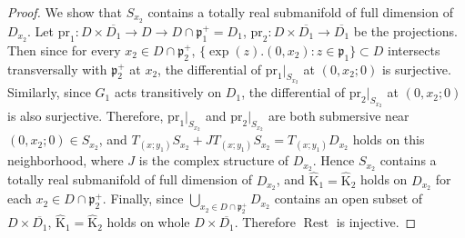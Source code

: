 \documentclass[pdftex]{sigma}
\numberwithin{equation}{section}
\newcommand{\fp}{\mathfrak{p}}
\newcommand{\rK}{\mathrm{K}}
\newcommand{\Rest}{\operatorname{Rest}}
\begin{document}
\begin{proof}
We show that $S_{x_2}$ contains a totally real submanifold of full dimension of $D_{x_2}$.
Let $\mathrm{pr}_1\colon D\times\overline{D_1}\to D\to D\cap\fp^+_1=D_1$, $\mathrm{pr}_2\colon D\times\overline{D_1}\to \overline{D_1}$
be the projections. Then since for every $x_2\in D\cap\fp^+_2$, $\{\exp(z).(0,x_2)\colon z\in\fp_1\}\subset D$ intersects transversally
with $\fp^+_2$ at $x_2$, the differential of $\mathrm{pr}_1|_{S_{x_2}}$ at $(0,x_2;0)$ is surjective.
Similarly, since $G_1$ acts transitively on $D_1$, the differential of $\mathrm{pr}_2|_{S_{x_2}}$ at $(0,x_2;0)$ is also surjective.
Therefore, $\mathrm{pr}_1|_{S_{x_2}}$ and $\mathrm{pr}_2|_{S_{x_2}}$ are both submersive near $(0,x_2;0)\in S_{x_2}$,
and $T_{(x;y_1)}S_{x_2}+JT_{(x;y_1)}S_{x_2}=T_{(x;y_1)}D_{x_2}$ holds on this neighborhood,
where $J$ is the complex structure of $D_{x_2}$. Hence $S_{x_2}$ contains a totally real submanifold of full dimension of $D_{x_2}$,
and $\hat{\rK}_1=\hat{\rK}_2$ holds on $D_{x_2}$ for each $x_2\in D\cap\fp^+_2$.
Finally, since $\bigcup_{x_2\in D\cap\fp^+_2} D_{x_2}$ contains an open subset of $D\times\overline{D_1}$,
$\hat{\rK}_1=\hat{\rK}_2$ holds on whole $D\times\overline{D_1}$. Therefore $\Rest$ is injective.
\end{proof}
\end{document}
